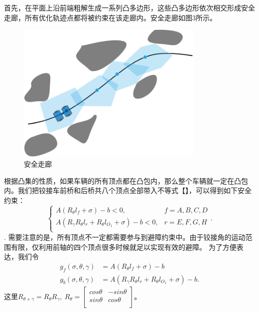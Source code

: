 \documentclass[master,academic]{ysuthesis} %
\begin{document}
		首先，在平面上沿前端粗解生成一系列凸多边形，这些凸多边形依次相交形成安全走廊，所有优化轨迹点都将被约束在该走廊内。安全走廊如图3所示。
		\begin{figure}[!ht]
			\centering
			\includegraphics[width=0.8\textwidth]{安全走廊.png}
			\caption{安全走廊}
			\label{fig:安全走廊}
		\end{figure}
		根据凸集的性质，如果车辆的所有顶点都在凸包内，那么整个车辆就一定在凸包内。我们把铰接车前桥和后桥共八个顶点全部带入不等式【】，可以得到如下安全约束：
		\begin{equation}
			\left\{ \begin{matrix}
				A\left( R_{\theta}l_f+\sigma \right) -b<0,&		f=A,B,C,D\\
				A\left( R_{\gamma}R_{\theta}l_r+R_{\theta}l_{O_1}+\sigma \right) -b<0,&		r=E,F,G,H\\
			\end{matrix} \right. .
		\end{equation}.
		需要注意的是，所有顶点不一定都需要参与到避障约束中。由于铰接角的运动范围有限，仅利用前轴的四个顶点很多时候就足以实现有效的避障。
		为了方便表达，我们令
		\begin{equation}
			\begin{aligned}
			g_f\left( \sigma ,\theta ,\gamma \right) &=A\left( R_{\theta}l_f+\sigma \right) -b\\
			g_b\left( \sigma ,\theta ,\gamma \right) &=A\left( R_{\gamma}R_{\theta}l_r+R_{\theta}l_{O_1}+\sigma \right) -b.
			\end{aligned}
		\end{equation}
		这里$R_{\theta +\gamma}=R_{\theta}R_{\gamma},\ R_{\theta}=\left[ \begin{matrix}
			cos\theta&		-sin\theta\\
			sin\theta&		cos\theta\\
		\end{matrix} \right] $。
\end{document}
